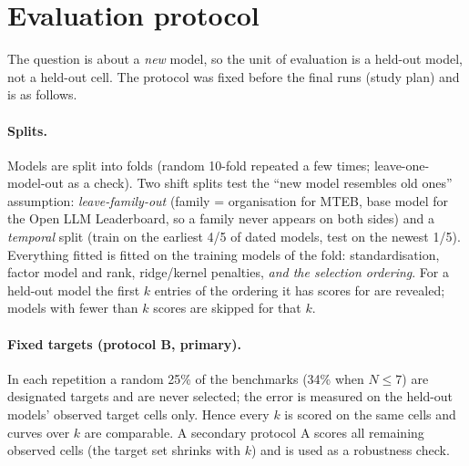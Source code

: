\section{Evaluation protocol}
\label{sec:protocol}
The question is about a \emph{new} model, so the unit of evaluation is a held-out model, not a held-out cell. The protocol was fixed before the final runs (study plan) and is as follows.

\paragraph{Splits.}
Models are split into folds (random 10-fold repeated a few times; leave-one-model-out as a check). Two shift splits test the ``new model resembles old ones'' assumption: \emph{leave-family-out} (family = organisation for MTEB, base model for the Open LLM Leaderboard, so a family never appears on both sides) and a \emph{temporal} split (train on the earliest 4/5 of dated models, test on the newest 1/5). Everything fitted is fitted on the training models of the fold: standardisation, factor model and rank, ridge/kernel penalties, \emph{and the selection ordering}. For a held-out model the first $k$ entries of the ordering it has scores for are revealed; models with fewer than $k$ scores are skipped for that $k$.

\paragraph{Fixed targets (protocol B, primary).}
In each repetition a random 25\% of the benchmarks (34\% when $N\le7$) are designated targets and are never selected; the error is measured on the held-out models' observed target cells only. Hence every $k$ is scored on the same cells and curves over $k$ are comparable. A secondary protocol A scores all remaining observed cells (the target set shrinks with $k$) and is used as a robustness check.

